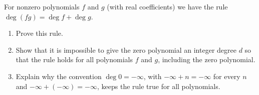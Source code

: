 For nonzero polynomials $f$ and $g$ (with real coefficients) we have the rule $\deg(fg)=\deg f+\deg g$.
\begin{enumerate}
\item[(a)] Prove this rule.
\item[(b)] Show that it is impossible to give the zero polynomial an integer degree $d$ so that the rule holds for all polynomials $f$ and $g$, including the zero polynomial.
\item[(c)] Explain why the convention $\deg0=-\infty$, with $-\infty+n=-\infty$ for every $n$ and $-\infty+(-\infty)=-\infty$, keeps the rule true for all polynomials.
\end{enumerate}
